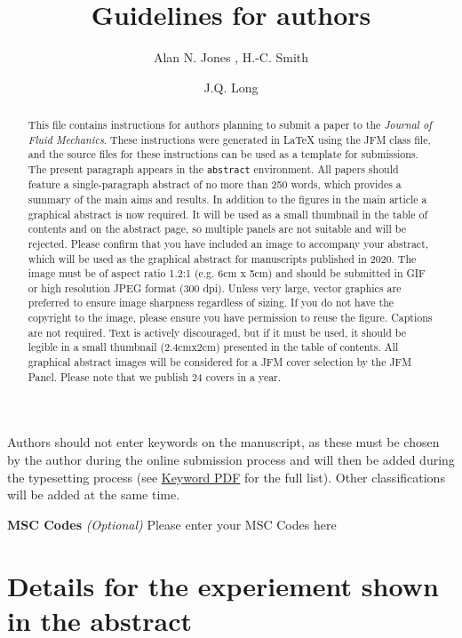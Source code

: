 \documentclass[lineno]{jfm}
\title{Guidelines for authors}
\author{Alan N. Jones\aff{1}
  \corresp{\email{JFMEditorial@cambridge.org}},
  H.-C. Smith\aff{1}
 \and J.Q. Long\aff{2}}
\affiliation{\aff{1}STM Journals, Cambridge University Press, The Printing House, Shaftesbury Road, Cambridge CB2 8BS, UK
\aff{2}DAMTP, Centre for Mathematical Sciences, Wilberforce Road, Cambridge CB3 0WA, UK}
\begin{document}
\maketitle

\begin{abstract}
This file contains instructions for authors planning to submit a paper to the {\it Journal of Fluid Mechanics}. These instructions were generated in {\LaTeX} using the JFM class file, and the source files for these instructions can be used as a template for submissions. The present paragraph appears in the \verb}abstract} environment. All papers should feature a single-paragraph abstract of no more than 250 words, which provides a summary of the main aims and results.  In addition to the figures in the main article a graphical abstract is now required. It will be used as a small thumbnail in the table of contents and on the abstract page, so multiple panels are not suitable and will be rejected. Please confirm that you have included an image to accompany your abstract, which will be used as the graphical abstract for manuscripts published in 2020. The image must be of aspect ratio 1.2:1 (e.g. 6cm x 5cm) and should be submitted in GIF or high resolution JPEG format (300 dpi). Unless very large, vector graphics are preferred to ensure image sharpness regardless of sizing. If you do not have the copyright to the image, please ensure you have permission to reuse the figure. Captions are not required. Text is actively discouraged, but if it must be used, it should be legible in a small thumbnail (2.4cmx2cm) presented in the table of contents. All graphical abstract images will be considered for a JFM cover selection by the JFM Panel. Please note that we publish 24 covers in a year.
\end{abstract}

\begin{keywords}
Authors should not enter keywords on the manuscript, as these must be chosen by the author during the online submission process and will then be added during the typesetting process (see \href{https://www.cambridge.org/core/journals/journal-of-fluid-mechanics/information/list-of-keywords}{Keyword PDF} for the full list).  Other classifications will be added at the same time.
\end{keywords}

{\bf MSC Codes }  {\it(Optional)} Please enter your MSC Codes here



\section{Details for the experiement shown in the abstract}
\end{document}
